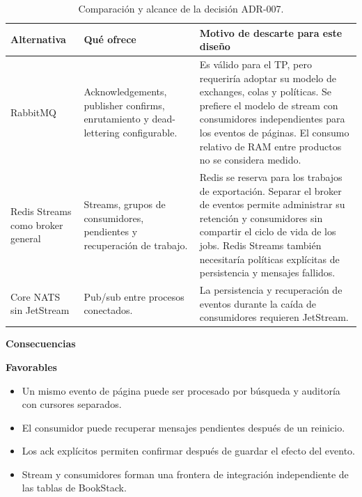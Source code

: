 \begin{table}[H]
\centering\small
\begin{tabularx}{\textwidth}{>{\raggedright\arraybackslash}X>{\raggedright\arraybackslash}X>{\raggedright\arraybackslash}X}
\toprule
\textbf{Alternativa} & \textbf{Qué ofrece} & \textbf{Motivo de descarte para este diseño} \\
\midrule
RabbitMQ & Acknowledgements, publisher confirms, enrutamiento y dead-lettering configurable. & Es válido para el TP, pero requeriría adoptar su modelo de exchanges, colas y políticas. Se prefiere el modelo de stream con consumidores independientes para los eventos de páginas. El consumo relativo de RAM entre productos no se considera medido. \\
Redis Streams como broker general & Streams, grupos de consumidores, pendientes y recuperación de trabajo. & Redis se reserva para los trabajos de exportación. Separar el broker de eventos permite administrar su retención y consumidores sin compartir el ciclo de vida de los jobs. Redis Streams también necesitaría políticas explícitas de persistencia y mensajes fallidos. \\
Core NATS sin JetStream & Pub/sub entre procesos conectados. & La persistencia y recuperación de eventos durante la caída de consumidores requieren JetStream. \\
\bottomrule
\end{tabularx}
\caption{Comparación y alcance de la decisión ADR-007.}
\label{tab:adr-007}
\end{table}

\par\medskip\noindent\textbf{Consecuencias}\par\nobreak\smallskip

\par\medskip\noindent\textbf{Favorables}\par\nobreak\smallskip

\begin{itemize}[leftmargin=1.5em,itemsep=3pt]
\item Un mismo evento de página puede ser procesado por búsqueda y auditoría con cursores separados.
\item El consumidor puede recuperar mensajes pendientes después de un reinicio.
\item Los ack explícitos permiten confirmar después de guardar el efecto del evento.
\item Stream y consumidores forman una frontera de integración independiente de las tablas de BookStack.
\end{itemize}

